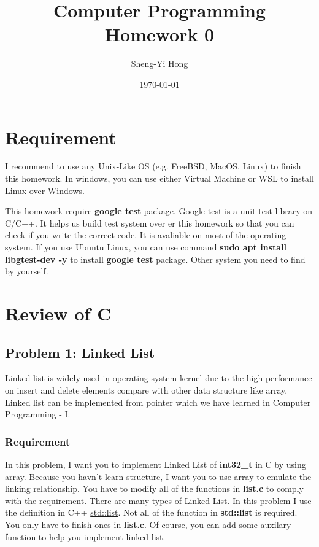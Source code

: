 \documentclass{report}
\title{Computer Programming Homework 0}
\author{Sheng-Yi Hong}
\date{\today}
\begin{document}
\maketitle

\tableofcontents

\chapter{Requirement}

I recommend to use any Unix-Like OS (e.g. FreeBSD, MacOS, Linux) to finish this
homework. In windows, you can use either Virtual Machine or WSL to install Linux over Windows.

This homework require \textbf{google test} package. Google test is a unit test
library on C/C++. It helps us build test system over
er this homework so that you can check
if you write the correct code. It is avaliable on most of the operating system.
If you use Ubuntu Linux, you can use command \textbf{sudo apt install
  libgtest-dev -y} to install \textbf{google test} package. Other system you need to find by yourself.

\chapter{Review of C}

\section{Problem 1: Linked List}

Linked list is widely used in operating system kernel due to the high
performance on insert and delete elements compare with other data structure like
array. Linked list can be implemented from pointer which we have learned in
Computer Programming - I.

\subsection{Requirement}

In this problem, I want you to implement Linked List of \textbf{int32\_t} in C by
using array. Because you havn't learn structure, I want you to use array to
emulate the linking relationship. You have to modify all of the functions in \textbf{list.c} to
comply with the requirement. There are many types of Linked List. In this
problem I use the definition in C++
\href{https://en.cppreference.com/w/cpp/container/list}{std::list}. Not all of
the function in \textbf{std::list} is required. You only have to finish ones in
\textbf{list.c}. Of course, you can add some auxilary function to help you
implement linked list.
\end{document}
